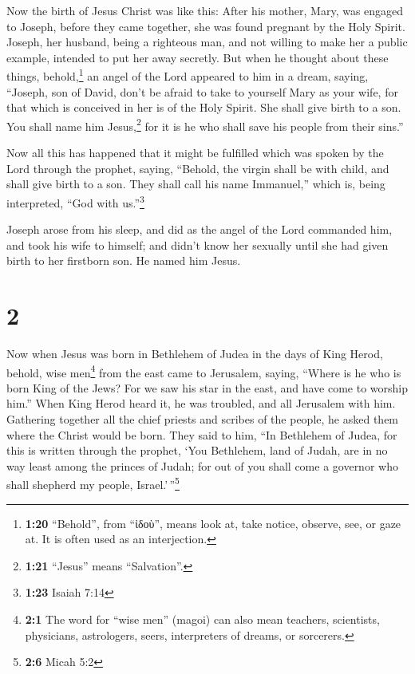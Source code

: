  Now the birth of Jesus Christ was like this: After his
mother, Mary, was engaged to Joseph, before they came together, she was
found pregnant by the Holy Spirit.  Joseph, her husband,
being a righteous man, and not willing to make her a public example,
intended to put her away secretly.  But when he thought
about these things, behold,\footnote{\textbf{1:20} ``Behold'', from
  ``ἰδοὺ'', means look at, take notice, observe, see, or gaze at. It is
  often used as an interjection.} an angel of the Lord appeared to him
in a dream, saying, ``Joseph, son of David, don't be afraid to take to
yourself Mary as your wife, for that which is conceived in her is of the
Holy Spirit.  She shall give birth to a son. You shall
name him Jesus,\footnote{\textbf{1:21} ``Jesus'' means ``Salvation''.}
for it is he who shall save his people from their sins.''

 Now all this has happened that it might be fulfilled
which was spoken by the Lord through the prophet, saying,
 ``Behold, the virgin shall be with child, and shall give
birth to a son. They shall call his name Immanuel,'' which is, being
interpreted, ``God with us.''\footnote{\textbf{1:23} Isaiah 7:14}

 Joseph arose from his sleep, and did as the angel of the
Lord commanded him, and took his wife to himself;  and
didn't know her sexually until she had given birth to her firstborn son.
He named him Jesus.

\hypertarget{section-1}{%
\section{2}\label{section-1}}

 Now when Jesus was born in Bethlehem of Judea in the days
of King Herod, behold, wise men\footnote{\textbf{2:1} The word for
  ``wise men'' (magoi) can also mean teachers, scientists, physicians,
  astrologers, seers, interpreters of dreams, or sorcerers.} from the
east came to Jerusalem, saying,  ``Where is he who is born
King of the Jews? For we saw his star in the east, and have come to
worship him.''  When King Herod heard it, he was troubled,
and all Jerusalem with him.  Gathering together all the
chief priests and scribes of the people, he asked them where the Christ
would be born.  They said to him, ``In Bethlehem of Judea,
for this is written through the prophet,  `You Bethlehem,
land of Judah, are in no way least among the princes of Judah; for out
of you shall come a governor who shall shepherd my people,
Israel.'\,''\footnote{\textbf{2:6} Micah 5:2}

